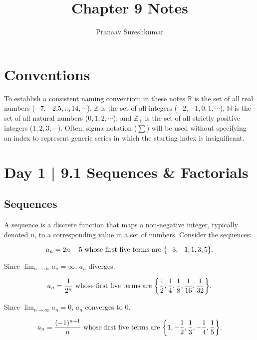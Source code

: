 \documentclass{article}
\title{Chapter 9 Notes}
\author{Pranaav Sureshkumar}
\theoremstyle{definition}
\DeclarePairedDelimiter{\curly}{\{}{\}}
\begin{document}
\maketitle

\tableofcontents

\section*{Conventions}
To establish a consistent naming convention; in these notes $\mathbb{R}$ is the set of all real numbers ($-7, -2.5, \pi, 14,\cdots$), $\mathbb{Z}$ is the set of all integers ($-2,-1,0,1,\cdots$), $\mathbb{N}$ is the set of all natural numbers ($0,1,2,\cdots$), and $\mathbb{Z_+}$ is the set of all strictly positive integers ($1,2,3,\cdots$). Often, sigma notation ($\sum$) will be used without specifying an index to represent generic series in which the starting index is insignificant.


\section{Day 1 | 9.1 Sequences \& Factorials}

\vspace{0.5cm}

\subsection{Sequences}
A sequence is a discrete function that maps a non-negative integer, typically denoted $n$, to a corresponding value in a set of numbers.
Consider the sequences:



\[a_n  = 2n-5 \text{ whose first five terms are } \curly*{-3, -1, 1, 3, 5}.\]
\begin{center}
    Since $\displaystyle\lim_{n \to \infty} a_n =\infty$, $a_n$ diverges.
\end{center}

\[a_n  = \frac{1}{2^n} \text{ whose first five terms are } \curly*{\frac{1}{2}, \frac{1}{4}, \frac{1}{8}, \frac{1}{16}, \frac{1}{32}}.\]

\begin{center}
    Since $\displaystyle\lim_{n \to \infty} a_n = 0$, $a_n$ converges to 0.
\end{center}

\[a_n  = \frac{(-1)^{n+1}}{n} \text{ whose first five terms are } \curly*{1, -\frac{1}{2}, \frac{1}{3}, -\frac{1}{4}, \frac{1}{5}}.\]
\end{document}
